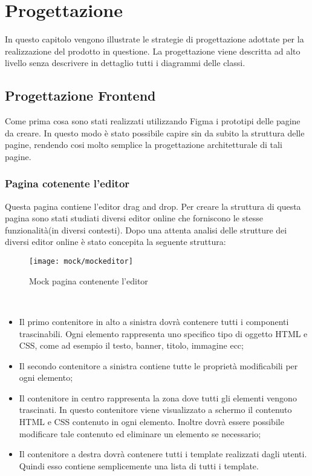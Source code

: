 
\chapter{Progettazione}
\label{cap:progettazione}
\label{sec:tecnologie-strumenti}

In questo capitolo vengono illustrate le strategie di progettazione adottate per la realizzazione del prodotto in questione. La progettazione viene descritta ad alto livello senza descrivere in dettaglio tutti i diagrammi delle classi. 

\section{Progettazione Frontend}
\label{sec:progettazione}
Come prima cosa sono stati realizzati utilizzando Figma i prototipi delle pagine da creare. In questo modo è stato possibile capire sin da subito la struttura delle pagine, rendendo cosi molto semplice la progettazione architetturale di tali pagine.
\subsection{Pagina cotenente l'editor}
Questa pagina contiene l'editor drag and drop. Per creare la struttura di questa pagina sono stati studiati diversi editor online che forniscono le stesse funzionalità(in diversi contesti). Dopo una attenta analisi delle strutture dei diversi editor online è stato concepita la seguente struttura:
\begin{figure}[!h] 
	\centering 
	\texttt{[image: mock/mockeditor]} 
	\caption{Mock pagina contenente l'editor}
\end{figure}  
\\
\begin{itemize}
	\item Il primo contenitore in alto a sinistra dovrà contenere tutti i componenti trascinabili. Ogni elemento rappresenta uno specifico tipo di oggetto HTML e CSS, come ad esempio il testo, banner, titolo, immagine ecc;
	\item Il secondo contenitore a sinistra contiene tutte le proprietà modificabili per ogni elemento;
	\item Il contenitore in centro rappresenta la zona dove tutti gli elementi vengono trascinati. In questo contenitore viene visualizzato a schermo il contenuto HTML e CSS contenuto in ogni elemento. Inoltre dovrà essere possibile modificare tale contenuto ed eliminare un elemento se necessario;
	\item Il contenitore a destra dovrà contenere tutti i template realizzati dagli utenti. Quindi esso contiene semplicemente una lista di tutti i template.  
\end{itemize}

